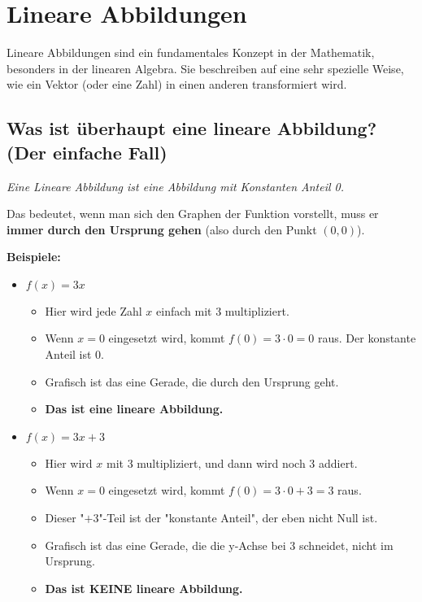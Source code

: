 \chapter{Lineare Abbildungen}

Lineare Abbildungen sind ein fundamentales Konzept in der Mathematik, besonders
in der linearen Algebra. Sie beschreiben auf eine sehr spezielle Weise, wie ein
Vektor (oder eine Zahl) in einen anderen transformiert wird.

\section{Was ist überhaupt eine lineare Abbildung? (Der einfache Fall)}

\textit{Eine Lineare Abbildung ist eine Abbildung mit Konstanten Anteil 0.}

Das bedeutet, wenn man sich den Graphen der Funktion vorstellt, muss er
\textbf{immer durch den Ursprung gehen} (also durch den Punkt $(0,0)$).

\textbf{Beispiele:}
\begin{itemize}
    \item $f(x) = 3x$
          \begin{itemize}
              \item Hier wird jede Zahl $x$ einfach mit 3 multipliziert.
              \item Wenn $x=0$ eingesetzt wird, kommt $f(0) = 3 \cdot 0 = 0$ raus. Der konstante
                    Anteil ist 0.
              \item Grafisch ist das eine Gerade, die durch den Ursprung geht.
              \item \textbf{Das ist eine lineare Abbildung.}
          \end{itemize}

    \item $f(x) = 3x + 3$
          \begin{itemize}
              \item Hier wird $x$ mit 3 multipliziert, und dann wird noch 3 addiert.
              \item Wenn $x=0$ eingesetzt wird, kommt $f(0) = 3 \cdot 0 + 3 = 3$ raus.
              \item Dieser "$+3$"-Teil ist der "konstante Anteil", der eben nicht Null ist.
              \item Grafisch ist das eine Gerade, die die y-Achse bei 3 schneidet, nicht im
                    Ursprung.
              \item \textbf{Das ist KEINE lineare Abbildung.}
          \end{itemize}
\end{itemize}

